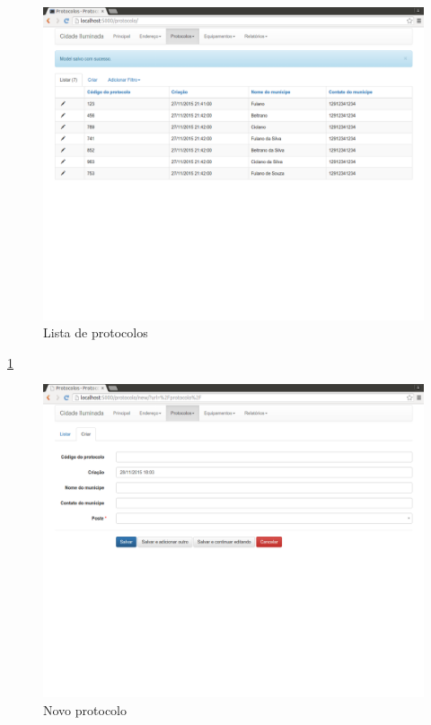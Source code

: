 \documentclass[
	article,			%
	11pt,				%
	oneside,			%
	a4paper,			%
	english,			%
	brazil,				%
	sumario=tradicional
	]{abntex2}
\begin{document}
\begin{figure}[!htbp]
 \centering
 \caption{\label{site-tela-inicial}Lista de protocolos}
 \includegraphics[scale=0.25]{site/1-lista_protocolos.png}
\end{figure}

\ref{site-tela-inicial}
\clearpage

\begin{figure}[!htbp]
 \centering
 \caption{\label{site-novo-protocolo}Novo protocolo}
 \includegraphics[scale=0.25]{site/2-novo_protocolo.png}
\end{figure}
\end{document}
